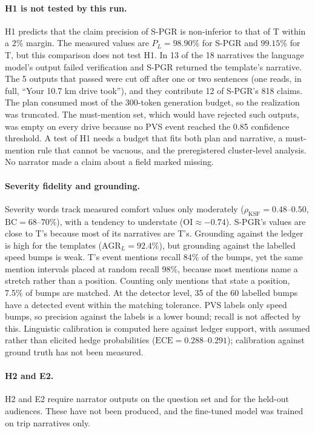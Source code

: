 \paragraph{H1 is not tested by this run.}
H1 predicts that the claim precision of S-PGR is non-inferior to that of T within a 2\% margin.
The measured values are $P_L = 98.90\%$ for S-PGR and $99.15\%$ for T, but this comparison does not test H1.
In 13 of the 18 narratives the language model's output failed verification and S-PGR returned the template's narrative.
The 5 outputs that passed were cut off after one or two sentences (one reads, in full, ``Your 10.7 km drive took''), and they contribute 12 of S-PGR's 818 claims.
The plan consumed most of the 300-token generation budget, so the realization was truncated.
The must-mention set, which would have rejected such outputs, was empty on every drive because no PVS event reached the 0.85 confidence threshold.
A test of H1 needs a budget that fits both plan and narrative, a must-mention rule that cannot be vacuous, and the preregistered cluster-level analysis.
No narrator made a claim about a field marked missing.

\paragraph{Severity fidelity and grounding.}
Severity words track measured comfort values only moderately ($\rho_{\mathrm{KSF}} = 0.48$--$0.50$, $\mathrm{BC} = 68$--$70\%$), with a tendency to understate ($\mathrm{OI} \approx -0.74$).
S-PGR's values are close to T's because most of its narratives are T's.
Grounding against the ledger is high for the templates ($\mathrm{AGR}_L = 92.4\%$), but grounding against the labelled speed bumps is weak.
T's event mentions recall 84\% of the bumps, yet the same mention intervals placed at random recall 98\%, because most mentions name a stretch rather than a position.
Counting only mentions that state a position, 7.5\% of bumps are matched.
At the detector level, 35 of the 60 labelled bumps have a detected event within the matching tolerance.
PVS labels only speed bumps, so precision against the labels is a lower bound; recall is not affected by this.
Linguistic calibration is computed here against ledger support, with assumed rather than elicited hedge probabilities ($\mathrm{ECE} = 0.288$--$0.291$); calibration against ground truth has not been measured.

\paragraph{H2 and E2.}
H2 and E2 require narrator outputs on the question set and for the held-out audiences.
These have not been produced, and the fine-tuned model was trained on trip narratives only.

